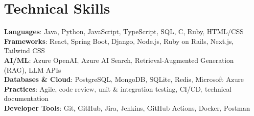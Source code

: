\documentclass[letterpaper,10pt]{article}
\begin{document}
\section{Technical Skills}
 \begin{itemize}[leftmargin=0.15in, label={}]
    \small{\item{
     \textbf{Languages}{: Java, Python, JavaScript, TypeScript, SQL, C, Ruby, HTML/CSS} \\
     \textbf{Frameworks}{: React, Spring Boot, Django, Node.js, Ruby on Rails, Next.js, Tailwind CSS} \\
     \textbf{AI/ML}{: Azure OpenAI, Azure AI Search, Retrieval-Augmented Generation (RAG), LLM APIs} \\
     \textbf{Databases \& Cloud}{: PostgreSQL, MongoDB, SQLite, Redis, Microsoft Azure} \\
     \textbf{Practices}{: Agile, code review, unit \& integration testing, CI/CD, technical documentation} \\
     \textbf{Developer Tools}{: Git, GitHub, Jira, Jenkins, GitHub Actions, Docker, Postman} \\
    }}
 \end{itemize}

\end{document}
